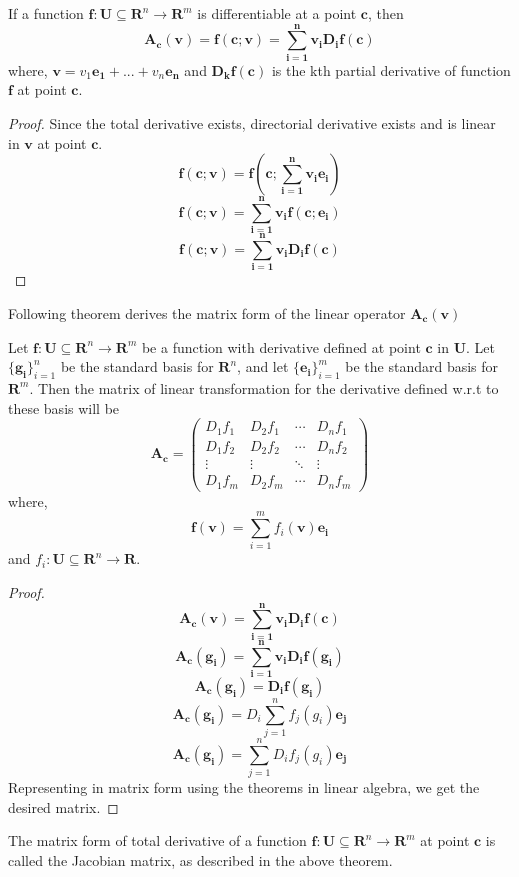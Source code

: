 \begin{theorem}
    If a function $\bm{f} : \bm{U} \subseteq \bm{R}^n \rightarrow \bm{R}^m$ is
    differentiable at a point $\bm{c}$, then
    \[
        \bm{A_c(v) = f(c;v) = \sum_{i = 1}^{n} v_i D_i f(c)}
    \]
    where, $\bm{v} = v_1\bm{e_1} +...+ v_n\bm{e_n}$ and $\bm{D_kf(c)}$ is the
    kth partial derivative of function $\bm{f}$ at point $\bm{c}$.
\end{theorem}
\begin{proof}
Since the total derivative exists, directorial derivative exists and is linear
    in $\bm{v}$ at point $\bm{c}$.
    \[
        \bm{f(c;v) = f(c;\sum_{i=1}^{n} v_i e_i)}
    \]
    \[
        \bm{f(c;v) = \sum_{i=1}^{n} v_i f(c;e_i)}
    \]
    \[
        \bm{f(c;v) = \sum_{i=1}^{n} v_i D_if(c)}
    \]
\end{proof}

Following theorem derives the matrix form of the linear operator $\bm{A_c(v)}$
\begin{theorem}
    Let $\bm{f} : \bm{U} \subseteq \bm{R}^n \rightarrow \bm{R}^m$ be a function
    with derivative defined at point $\bm{c}$ in $\bm{U}$. Let
    $\{\bm{g_i}\}_{i=1}^{n}$ be the standard basis for $\bm{R}^n$, and let
    $\{\bm{e_i}\}_{i=1}^{m}$ be the standard basis for $\bm{R}^m$. Then the
    matrix of linear transformation for the derivative defined w.r.t to these
    basis will be
    \[
        \bm{A_{c}} =
        \begin{pmatrix}
            D_{1}f_{1} & D_{2}f_{1} & \cdots & D_{n}f_{1} \\
            D_{1}f_{2} & D_{2}f_{2} & \cdots & D_{n}f_{2} \\
            \vdots  & \vdots  & \ddots & \vdots  \\
            D_{1}f_{m} & D_{2}f_{m} & \cdots & D_{n}f_{m}
        \end{pmatrix}
    \]
    where,
    \[
        \bm{f(v)} = \sum_{i=1}^{m} f_i(\bm{v}) \bm{e_i}
    \]
    and $f_i : \bm{U} \subseteq \bm{R}^n \rightarrow \bm{R}$.
\end{theorem}
\begin{proof}
    \[
        \bm{A_c(v) = \sum_{i = 1}^{n} v_i D_i f(c)}
    \]
    \[
        \bm{A_c(g_i) = \sum_{i = 1}^{n} v_i D_i f(g_i)}
    \]
    \[
        \bm{A_c(g_i) = D_i f(g_i)}
    \]
    \[
        \bm{A_c(g_i)} = D_i \sum_{j=1}^{n}f_j(g_i)\bm{e_j}
    \]
    \[
        \bm{A_c(g_i)} = \sum_{j=1}^{n} D_i f_j(g_i)\bm{e_j}
    \]
    Representing in matrix form using the theorems in linear algebra, we get the
    desired matrix.
\end{proof}
\begin{definition}
    The matrix form of total derivative of a function $\bm{f} : \bm{U} \subseteq
    \bm{R}^n \rightarrow \bm{R}^m$ at point $\bm{c}$ is called the Jacobian
    matrix, as described in the above theorem.
\end{definition}

